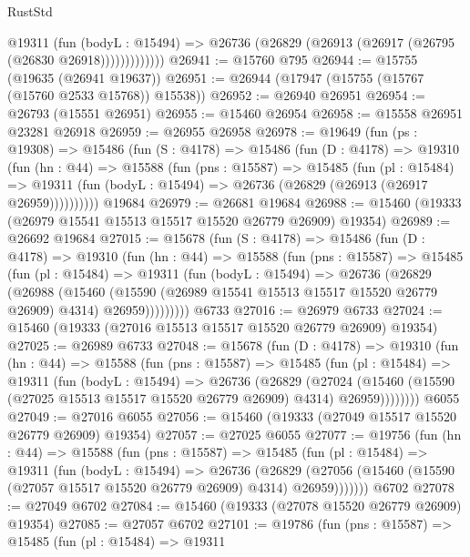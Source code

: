 \begin{lexlean}{RustStd}
\begin{coremodule}
                @19311
                  (fun (bodyL : @15494) =>
                  @26736 (@26829 (@26913 (@26917 (@26795 (@26830 @26918)))))))))))))
@26941 := @15760 @795
@26944 := @15755 (@19635 (@26941 @19637))
@26951 := @26944 (@17947 (@15755 (@15767 (@15760 @2533 @15768)) @15538))
@26952 := @26940 @26951
@26954 := @26793 (@15551 @26951)
@26955 := @15460 @26954
@26958 := @15558 @26951 @23281 @26918
@26959 := @26955 @26958
@26978 := @19649
    (fun (ps : @19308) =>
    @15486
      (fun (S : @4178) =>
      @15486
        (fun (D : @4178) =>
        @19310
          (fun (hn : @44) =>
          @15588
            (fun (pns : @15587) =>
            @15485
              (fun (pl : @15484) =>
              @19311 (fun (bodyL : @15494) => @26736 (@26829 (@26913 (@26917 @26959))))))))))
    @19684
@26979 := @26681 @19684
@26988 := @15460 (@19333 (@26979 @15541 @15513 @15517 @15520 @26779 @26909) @19354)
@26989 := @26692 @19684
@27015 := @15678
    (fun (S : @4178) =>
    @15486
      (fun (D : @4178) =>
      @19310
        (fun (hn : @44) =>
        @15588
          (fun (pns : @15587) =>
          @15485
            (fun (pl : @15484) =>
            @19311
              (fun (bodyL : @15494) =>
              @26736
                (@26829
                  (@26988
                    (@15460
                      (@15590 (@26989 @15541 @15513 @15517 @15520 @26779 @26909) @4314)
                      @26959)))))))))
    @6733
@27016 := @26979 @6733
@27024 := @15460 (@19333 (@27016 @15513 @15517 @15520 @26779 @26909) @19354)
@27025 := @26989 @6733
@27048 := @15678
    (fun (D : @4178) =>
    @19310
      (fun (hn : @44) =>
      @15588
        (fun (pns : @15587) =>
        @15485
          (fun (pl : @15484) =>
          @19311
            (fun (bodyL : @15494) =>
            @26736
              (@26829
                (@27024
                  (@15460 (@15590 (@27025 @15513 @15517 @15520 @26779 @26909) @4314) @26959))))))))
    @6055
@27049 := @27016 @6055
@27056 := @15460 (@19333 (@27049 @15517 @15520 @26779 @26909) @19354)
@27057 := @27025 @6055
@27077 := @19756
    (fun (hn : @44) =>
    @15588
      (fun (pns : @15587) =>
      @15485
        (fun (pl : @15484) =>
        @19311
          (fun (bodyL : @15494) =>
          @26736
            (@26829
              (@27056 (@15460 (@15590 (@27057 @15517 @15520 @26779 @26909) @4314) @26959)))))))
    @6702
@27078 := @27049 @6702
@27084 := @15460 (@19333 (@27078 @15520 @26779 @26909) @19354)
@27085 := @27057 @6702
@27101 := @19786
    (fun (pns : @15587) =>
    @15485
      (fun (pl : @15484) =>
      @19311

\end{coremodule}
\end{lexlean}
